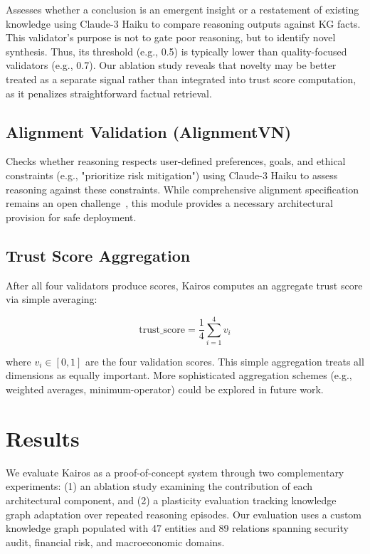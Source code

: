 \documentclass{article}
\begin{document}
Assesses whether a conclusion is an emergent insight or a restatement of existing knowledge using Claude-3 Haiku to compare reasoning outputs against KG facts. This validator's purpose is not to gate poor reasoning, but to identify novel synthesis. Thus, its threshold (e.g., 0.5) is typically lower than quality-focused validators (e.g., 0.7). Our ablation study reveals that novelty may be better treated as a separate signal rather than integrated into trust score computation, as it penalizes straightforward factual retrieval.

\subsection{Alignment Validation (AlignmentVN)}

Checks whether reasoning respects user-defined preferences, goals, and ethical constraints (e.g., "prioritize risk mitigation") using Claude-3 Haiku to assess reasoning against these constraints. While comprehensive alignment specification remains an open challenge~\citep{pan2024unifying}, this module provides a necessary architectural provision for safe deployment.

\subsection{Trust Score Aggregation}

After all four validators produce scores, Kairos computes an aggregate trust score via simple averaging:

\begin{equation}
\text{trust\_score} = \frac{1}{4} \sum_{i=1}^{4} v_i
\end{equation}

where $v_i \in [0,1]$ are the four validation scores. This simple aggregation treats all dimensions as equally important. More sophisticated aggregation schemes (e.g., weighted averages, minimum-operator) could be explored in future work.
\section{Results}

We evaluate Kairos as a proof-of-concept system through two complementary experiments: (1) an ablation study examining the contribution of each architectural component, and (2) a plasticity evaluation tracking knowledge graph adaptation over repeated reasoning episodes. Our evaluation uses a custom knowledge graph populated with 47 entities and 89 relations spanning security audit, financial risk, and macroeconomic domains.
\end{document}
